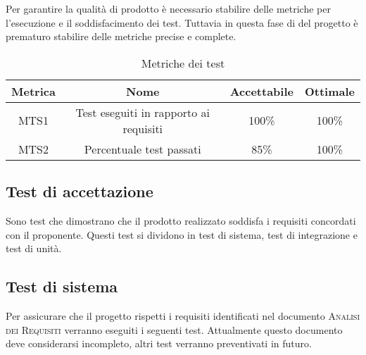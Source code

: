 \documentclass[../piano_di_qualifica.tex]{subfiles}
\begin{document}
Per garantire la qualità di prodotto è necessario stabilire delle metriche per l’esecuzione e il soddisfacimento dei test. Tuttavia in questa fase di del progetto è prematuro stabilire delle metriche precise e complete.


\begin{table}[!ht]
	\centering
	\begin{tabular}{|c|c|c|c|}
		\hline
		\rowcolor{lightgray}
		\textbf{Metrica} & \textbf{Nome}                          & \textbf{Accettabile} & \textbf{Ottimale} \\
		\hline
		MTS1             & Test eseguiti in rapporto ai requisiti & 100\%                & 100\%             \\
		MTS2             & Percentuale test passati               & 85\%                 & 100\%             \\
		\hline
	\end{tabular}
	\caption{Metriche dei test}
\end{table}

\subsection{Test di accettazione}%
\label{sub:test_accett}
Sono test che dimostrano che il prodotto realizzato soddisfa i requisiti concordati con il proponente.
Questi test si dividono in test di sistema, test di integrazione e test di unità.

\subsection{Test di sistema}%
\label{sub:test_sist}
Per assicurare che il progetto rispetti i requisiti identificati nel documento \textsc{Analisi dei Requisiti} verranno eseguiti i seguenti test. Attualmente questo documento deve considerarsi incompleto, altri test verranno preventivati in futuro.
\end{document}
